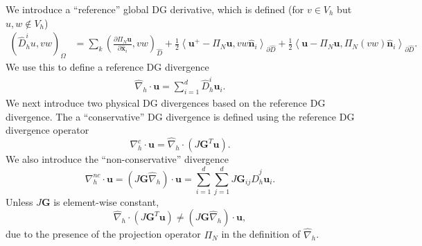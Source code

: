 \documentclass[preprint,10pt]{article}
\theoremstyle{definition}
\theoremstyle{lemma}
\theoremstyle{theorem}
\theoremstyle{assumption}
\renewcommand{\hat}{\widehat}
\newcommand{\pd}[2]{\frac{\partial#1}{\partial#2}}
\newcommand{\LRp}[1]{\left( #1 \right)}
\newcommand{\LRa}[1]{\left\langle #1 \right\rangle}
\newcommand{\Grad} {\ensuremath{\nabla}}
\renewcommand{\d}{\partial}
\begin{document}
We introduce a ``reference'' global DG derivative, which is defined (for $v\in V_h$ but $u,w\not\in V_h$)
\begin{align*}
\LRp{\hat{D}^i_h u,vw}_{\Omega} &= \sum_k \LRp{\pd{\Pi_N\bm{u}}{\hat{\bm{x}}_i},vw}_{\hat{D}} 
 + \frac{1}{2}\LRa{ \bm{u}^+ - \Pi_N\bm{u},vw\hat{\bm{n}}_i}_{\d \hat{D}} +  \frac{1}{2}\LRa{ \bm{u} - \Pi_N\bm{u},\Pi_N\LRp{vw}\hat{\bm{n}}_i}_{\d \hat{D}}.
\end{align*}
We use this to define a reference DG divergence
\begin{align*}
\hat{\Grad}_h \cdot \bm{u} = \sum_{i=1}^d \hat{D}^i_h \bm{u}_i.
\end{align*}
We next introduce two physical DG divergences based on the reference DG divergence.  The a ``conservative'' DG divergence is defined using the reference DG divergence operator
\[
\Grad^c_h \cdot \bm{u} = \hat{\Grad}_h \cdot \LRp{J\bm{G}^T\bm{u}}.  
\]
We also introduce the ``non-conservative'' divergence 
\[
\Grad_h^{nc} \cdot \bm{u} = \LRp{J\bm{G}\hat{\Grad}_h}\cdot \bm{u} = \sum_{i=1}^d \sum_{j=1}^d J\bm{G}_{ij} \hat{D}^j_h\bm{u}_i.
\]
Unless $J\bm{G}$ is element-wise constant,
\[
\hat{\Grad}_h\cdot\LRp{J\bm{G}^T\bm{u}} \neq \LRp{J\bm{G}\hat{\Grad}_h}\cdot\bm{u}, 
\]
due to the presence of the projection operator $\Pi_N$ in the definition of $\hat{\Grad}_h$.  
\end{document}
